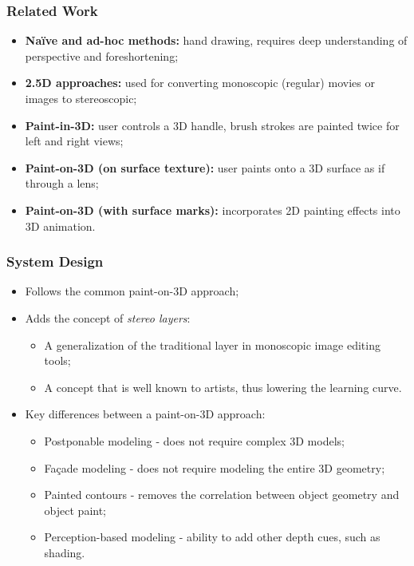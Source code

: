 \documentclass{beamer}
\begin{document}
\begin{frame}
    \frametitle{Related Work}
    \begin{itemize}
        \item \textbf{Na\"{i}ve and ad-hoc methods:} hand drawing, requires deep
        understanding of perspective and foreshortening;
        \item \textbf{2.5D approaches:} used for converting monoscopic (regular)
        movies or images to stereoscopic;
        \item \textbf{Paint-in-3D:} user controls a 3D handle, brush strokes are
        painted twice for left and right views;
        \item \textbf{Paint-on-3D (on surface texture):}  user paints onto a 3D
        surface as if through a lens;
        \item \textbf{Paint-on-3D (with surface marks):} incorporates 2D painting
        effects into 3D animation.
    \end{itemize}
\end{frame}

\begin{frame}
    \frametitle{System Design}
    \begin{itemize}
        \item Follows the common paint-on-3D approach;
        \item Adds the concept of \emph{stereo layers}:
        \begin{itemize}
            \item A generalization of the traditional layer in monoscopic image
            editing tools;
            \item A concept that is well known to artists, thus lowering the
            learning curve.
        \end{itemize}
        \item Key differences between a paint-on-3D approach:
        \begin{itemize}
            \item Postponable modeling - does not require complex 3D models;
            \item Fa\c{c}ade modeling - does not require modeling the entire 3D
            geometry;
            \item Painted contours - removes the correlation between object
            geometry and object paint;
            \item Perception-based modeling - ability to add other depth cues,
            such as shading.
        \end{itemize}
    \end{itemize}
\end{frame}
\end{document}

